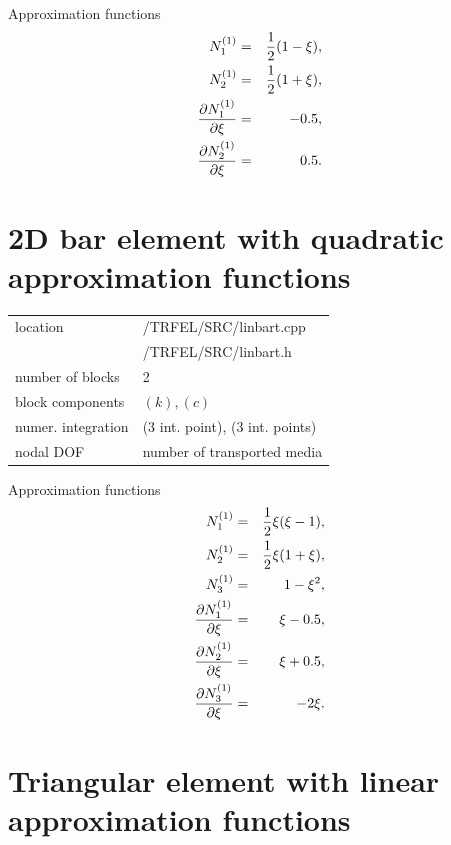 Approximation functions
\begin{eqnarray}
N_1^{(1)} &=& \mbox{$\displaystyle\frac{1}{2}$}(1-\xi),\nonumber\\
N_2^{(1)} &=& \mbox{$\displaystyle\frac{1}{2}$}(1+\xi),\nonumber\\
\mbox{$\displaystyle\frac{\partial{N_1^{(1)}}}{\partial{\xi}}$} &=& -0.5,\\
\mbox{$\displaystyle\frac{\partial{N_2^{(1)}}}{\partial{\xi}}$} &=& 0.5.\nonumber
\end{eqnarray}

\section{2D bar element with quadratic approximation functions}
\label{quadbart}

\begin{center}
\begin{tabular}{|l|l|}
\hline
location & /TRFEL/SRC/linbart.cpp\\
         & /TRFEL/SRC/linbart.h
\\ \hline
number of blocks & 2
\\ \hline
block components & $(k), (c)$
\\ \hline
numer. integration & (3 int. point), (3 int. points)
\\ \hline
nodal DOF & number of transported media
\\ \hline
\end{tabular}
\end{center}

Approximation functions
\begin{eqnarray}
N_1^{(1)} &=& \mbox{$\displaystyle\frac{1}{2}$}\xi(\xi-1),\nonumber\\
N_2^{(1)} &=& \mbox{$\displaystyle\frac{1}{2}$}\xi(1+\xi),\nonumber\\
N_3^{(1)} &=& 1-\xi^2,\\
\mbox{$\displaystyle\frac{\partial{N_1^{(1)}}}{\partial{\xi}}$} &=& \xi-0.5,\nonumber\\
\mbox{$\displaystyle\frac{\partial{N_2^{(1)}}}{\partial{\xi}}$} &=& \xi+0.5,\nonumber\\
\mbox{$\displaystyle\frac{\partial{N_3^{(1)}}}{\partial{\xi}}$} &=& -2\xi.\nonumber
\end{eqnarray}

\section{Triangular element with linear approximation functions}
\label{trlint}

